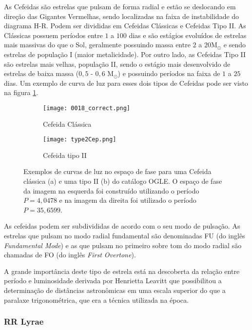 As Cefeidas são estrelas que pulsam de forma radial e estão se deslocando em direção das Gigantes Vermelhas, sendo localizadas na faixa de instabilidade do diagrama H-R. Podem ser divididas em Cefeidas Clássicas e Cefeidas Tipo II. As Clássicas possuem períodos entre $1$ a $100$ dias e são estágios evoluídos de estrelas mais massivas do que o Sol, geralmente possuindo massa entre $2$ a $20$M$_\odot$ e sendo estrelas de população I (maior metalicidade). Por outro lado, as Cefeidas Tipo II são estrelas mais velhas, população II, sendo o estágio mais desenvolvido de estrelas de baixa massa ($0,5$ - $0,6$ M$_\odot$) e possuindo períodos na faixa de $1$ a $25$ dias. Um exemplo de curva de luz para esses dois tipos de Cefeidas pode ser visto na figura \ref{fig:exemplo_cep}.

\begin{figure}[h!]
\centering
\begin{subfigure}{.5\textwidth}
  \centering
  \texttt{[image: 0018\_correct.png]}
  \caption{Cefeida Clássica}
\end{subfigure}%
\begin{subfigure}{.5\textwidth}
  \centering
  \texttt{[image: type2Cep.png]}
  \caption{Cefeida tipo II}
\end{subfigure}
\caption[Curva de luz de Cefeidas]{Exemplos de curvas de luz no espaço de fase para uma  Cefeida clássica (a) e uma tipo II (b) do catálogo OGLE. O espaço de fase da imagem na esquerda foi construído utilizando o período $P=4,0478$ e na imagem da direita foi utilizado o período $P=35,6599$.}
\label{fig:exemplo_cep}
\end{figure}

As cefeidas podem ser subdivididas de acordo com o seu modo de pulsação. As estrelas que pulsam no modo radial fundamental são denominadas FU (do inglês \textit{Fundamental Mode}) e as que pulsam no primeiro sobre tom do modo radial são chamadas de FO (do inglês \textit{First Overtone}).

A grande importância deste tipo de estrela está na descoberta da relação entre período e luminosidade derivada por Henrietta Leavitt \citep{Leavitt1912} que possibilitou a determinação de distâncias astronômicas em uma escala superior do que a paralaxe trigonométrica, que era a técnica utilizada na época.


\subsubsection{RR Lyrae}

